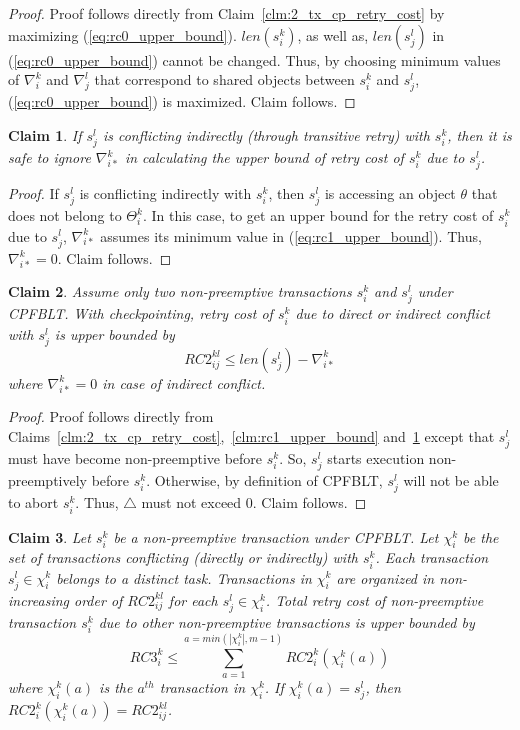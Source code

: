 \documentclass[conference]{IEEEtran}
\newtheorem{clm}{Claim}
\begin{document}
%
\begin{proof}
%
Proof follows directly from Claim~\ref{clm:2_tx_cp_retry_cost} by maximizing (\ref{eq:rc0_upper_bound}). $len\left(s_i^k\right)$, as well as, $len\left(s_j^l\right)$ in (\ref{eq:rc0_upper_bound}) cannot be changed. Thus, by choosing minimum values of $\nabla_i^k$ and $\nabla_j^l$ that correspond to shared objects between $s_i^k$ and $s_j^l$, (\ref{eq:rc0_upper_bound}) is maximized. Claim follows.
%
\end{proof}
%
\begin{clm}\label{clm:cp_with_transitive_retry}
If $s_j^l$ is conflicting indirectly (through transitive retry) with $s_i^k$, then it is safe to ignore $\nabla_{i*}^k$ in calculating the upper bound of retry cost of $s_i^k$ due to $s_j^l$.
\end{clm}
%
\begin{proof}
If $s_j^l$ is conflicting indirectly with $s_i^k$, then $s_j^l$ is accessing an object $\theta$ that does not belong to $\Theta_i^k$. In this case, to get an upper bound for the retry cost of $s_i^k$ due to $s_j^l$, $\nabla_{i*}^k$ assumes its minimum value in (\ref{eq:rc1_upper_bound}). Thus, $\nabla_{i*}^k=0$. Claim follows.
\end{proof}
%
\begin{clm}\label{clm:non_preemptive_2tx_cpfblt_rc}
Assume only two non-preemptive transactions $s_i^k$ and $s_j^l$ under CPFBLT. With checkpointing, retry cost of $s_i^k$ due to direct or indirect conflict with $s_j^l$ is upper bounded by 
%
\begin{equation}
RC2_{ij}^{kl} \le len\left(s_{j}^{l}\right)-\nabla_{i*}^{k}\label{eq:rc2_upper_bound}
\end{equation}
%
where $\nabla_{i*}^k=0$ in case of indirect conflict.
%
\end{clm}
%
\begin{proof}
Proof follows directly from Claims~\ref{clm:2_tx_cp_retry_cost},~\ref{clm:rc1_upper_bound} and~\ref{clm:cp_with_transitive_retry} except that $s_j^l$ must have become non-preemptive before $s_i^k$. So, $s_j^l$ starts execution non-preemptively before $s_i^k$. Otherwise, by definition of CPFBLT, $s_j^l$ will not be able to abort $s_i^k$. Thus, $\triangle$ must not exceed 0. Claim follows.
\end{proof}
%
\begin{clm}\label{clm:non_preemptive_all_tx_rc}
Let $s_i^k$ be a non-preemptive transaction under CPFBLT. Let $\chi_i^k$ be the set of transactions conflicting (directly or indirectly) with $s_i^k$. Each transaction $s_j^l \in \chi_i^k$ belongs to a distinct task. Transactions in $\chi_i^k$ are organized in non-increasing order of $RC2_{ij}^{kl}$ for each $s_j^l \in \chi_i^k$. Total retry cost of non-preemptive transaction $s_i^k$ due to other non-preemptive transactions is upper bounded by 
%
\begin{equation}
RC3_i^k \le \sum_{a=1}^{a=min\left(|\chi_i^k|, m-1\right)} RC2_i^k\left(\chi_i^k(a)\right)
\label{eq:non_preemptive_all_tx_rc}
\end{equation}
%
where $\chi_i^k(a)$ is the $a^{th}$ transaction in $\chi_i^k$. If $\chi_i^k(a)=s_j^l$, then $RC2_i^k\left(\chi_i^k(a)\right)=RC2_{ij}^{kl}$.
%
\end{clm}
\end{document}
